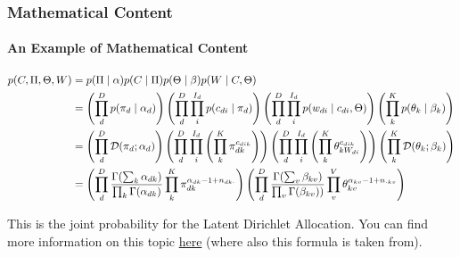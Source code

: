 	\begin{frame}
		\frametitle{Mathematical Content}
		\framesubtitle{An Example of Mathematical Content}
		
		\small
		\begin{align*}
            p(C, \Pi, \Theta, W) &= p( \Pi \mid \alpha) p(C \mid \Pi) p(\Theta \mid \beta) p(W \mid C, \Theta)\\
            &=
            \left(
            \prod_d^D p(\pi_d \mid \alpha_d)
            \right)
            \left(
            \prod_d^D
            \prod_i^{I_d} p(c_{di} \mid \pi_d)
            \right)
            \left(
            \prod_d^D
            \prod_i^{I_d} p(w_{di} \mid c_{di},\Theta)
            \right)
            \left(
            \prod_k^K
            p(\theta_k \mid \beta_k)
            \right)\\
            &=
            \left(
            \prod_d^D 
            {\mathcal D}(\pi_d; \alpha_d)
            \right)
            \left(
            \prod_d^D
            \prod_i^{I_d} 
            \left(
            \prod_k^K \pi_{dk}^{c_{dik}}
            \right)
            \right)
            \left(
            \prod_d^D
            \prod_i^{I_d} 
            \left(
            \prod_k^K \theta_{kW_{di}}^{c_{dik}}
            \right)
            \right)
            \left(
            \prod_k^K
            {\mathcal D} (\theta_k; \beta_k)
            \right)\\
            &= 
            \left(
            \prod_d^D  
            \frac{\Gamma (\sum_k \alpha_{dk})}{\prod_k \Gamma(\alpha_{dk})}
            \prod_k^K \pi_{dk}^{\alpha_{dk}-1+n_{dk\cdot}}
            \right)
            \left(
            \prod_d^D  
            \frac{\Gamma (\sum_v \beta_{kv})}{\prod_v \Gamma(\beta_{kv}))}
            \prod_v^V \theta_{kv}^{\alpha_{kv}-1+n_{\cdot kv}}
            \right)
        \end{align*}
        
        This is the joint probability for the Latent Dirichlet Allocation. You can find more information on this topic \hyperlink{https://www.youtube.com/watch?v=o22cA1DhSMQ&list=PL05umP7R6ij1tHaOFY96m5uX3J21a6yNd&index=22&t=0s}{here} (where also this formula is taken from).
	\end{frame}
